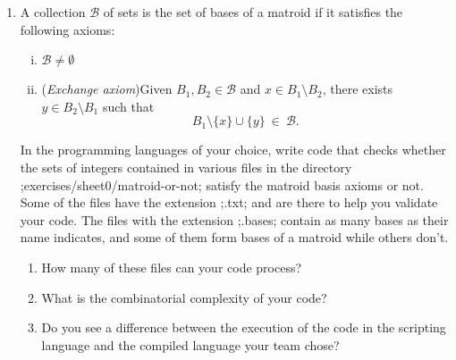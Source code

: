 \documentclass[11pt]{amsart}
\begin{document}
\bigskip
\begin{enumerate}
\item
  A collection $\mathcal B$ of sets is the set of bases of a matroid if it satisfies the following axioms:
  \begin{enumerate}[(i)]
  \item $\mathcal B\ne\emptyset$
  \item (\emph{Exchange axiom})\newline Given $B_1,B_2\in\mathcal B$ and $x\in B_1\setminus B_2$, there exists $y\in B_2\setminus B_1$ such that
    \[
      B_1 \setminus \{x\} \cup \{y\}
      \ \in\
      \mathcal B.
    \]
  \end{enumerate}

  In the programming languages of your choice,
  write code that checks whether the sets of integers contained in various files in the directory ;exercises/sheet0/matroid-or-not; satisfy the matroid basis axioms or not.
  Some of the files have the extension ;.txt; and are there to help you validate your code.
  The files with the extension ;.bases; contain as many bases as their name indicates, and some of them form bases of a matroid while others don't.

  \medskip
  \begin{enumerate}
  \item How many of these files can your code process?
  \item What is the combinatorial complexity of your code?
  \item Do you see a difference between the execution of the code in the scripting language and the compiled language your team chose?
\end{enumerate}
\end{enumerate}
\end{document}
